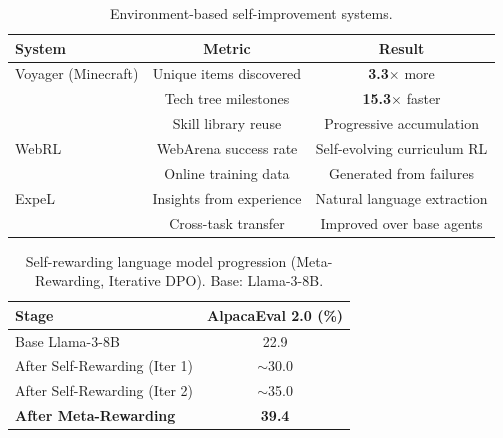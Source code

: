 \begin{table}[t]
\centering
\caption{Environment-based self-improvement systems.}
\label{tab:bench-env}
\begin{tabular}{@{}lcc@{}}
\toprule
\textbf{System} & \textbf{Metric} & \textbf{Result} \\
\midrule
Voyager (Minecraft) & Unique items discovered & \textbf{3.3$\times$} more \\
 & Tech tree milestones & \textbf{15.3$\times$} faster \\
 & Skill library reuse & Progressive accumulation \\
\midrule
WebRL & WebArena success rate & Self-evolving curriculum RL \\
 & Online training data & Generated from failures \\
\midrule
ExpeL & Insights from experience & Natural language extraction \\
 & Cross-task transfer & Improved over base agents \\
\bottomrule
\end{tabular}
\end{table}

\begin{table}[t]
\centering
\caption{Self-rewarding language model progression (Meta-Rewarding, Iterative DPO). Base: Llama-3-8B.}
\label{tab:bench-selfreward}
\begin{tabular}{@{}lc@{}}
\toprule
\textbf{Stage} & \textbf{AlpacaEval 2.0 (\%)} \\
\midrule
Base Llama-3-8B & 22.9 \\
After Self-Rewarding (Iter 1) & $\sim$30.0 \\
After Self-Rewarding (Iter 2) & $\sim$35.0 \\
\textbf{After Meta-Rewarding} & \textbf{39.4} \\
\bottomrule
\end{tabular}
\end{table}

